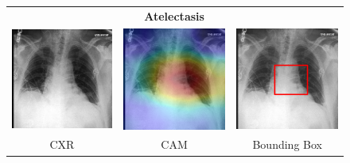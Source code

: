 \begin{figure}[htbp!]
\centering
\begin{tabular}{ccc}
 &\textbf{Atelectasis}& \\
\vspace{2mm}
  \includegraphics[width=35mm]{Tesi/images/CAMs/CAM5/image.png} &   
  \includegraphics[width=35mm]{Tesi/images/CAMs/CAM5/image_cam.png} &   
  \includegraphics[width=35mm]{Tesi/images/CAMs/CAM5/image_bbox.png} \\
\footnotesize{CXR} & \footnotesize{CAM} & \footnotesize{Bounding Box} \\[6pt]
\end{tabular}
\caption[Atelectasis CAM-2]{}
\label{fig:figure_5.19}
\end{figure}


